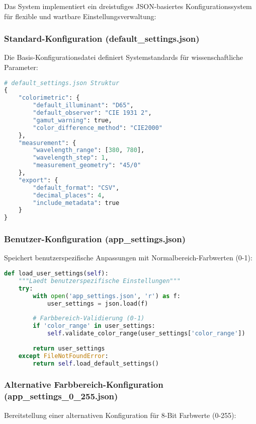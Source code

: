 Das System implementiert ein dreistufiges JSON-basiertes Konfigurationssystem für flexible und wartbare Einstellungsverwaltung:

\subsubsection{Standard-Konfiguration (default\_settings.json)}
Die Basis-Konfigurationsdatei definiert Systemstandards für wissenschaftliche Parameter:

\begin{lstlisting}[language=Python, caption=Standard-Konfiguration Struktur]
# default_settings.json Struktur
{
    "colorimetric": {
        "default_illuminant": "D65",
        "default_observer": "CIE 1931 2",
        "gamut_warning": true,
        "color_difference_method": "CIE2000"
    },
    "measurement": {
        "wavelength_range": [380, 780],
        "wavelength_step": 1,
        "measurement_geometry": "45/0"
    },
    "export": {
        "default_format": "CSV",
        "decimal_places": 4,
        "include_metadata": true
    }
}
\end{lstlisting}

\subsubsection{Benutzer-Konfiguration (app\_settings.json)}
Speichert benutzerspezifische Anpassungen mit Normalbereich-Farbwerten (0-1):

\begin{lstlisting}[language=Python, caption=Benutzer-Konfiguration Management]
def load_user_settings(self):
    """Laedt benutzerspezifische Einstellungen"""
    try:
        with open('app_settings.json', 'r') as f:
            user_settings = json.load(f)
            
        # Farbbereich-Validierung (0-1)
        if 'color_range' in user_settings:
            self.validate_color_range(user_settings['color_range'])
            
        return user_settings
    except FileNotFoundError:
        return self.load_default_settings()
\end{lstlisting}

\subsubsection{Alternative Farbbereich-Konfiguration (app\_settings\_0\_255.json)}
Bereitstellung einer alternativen Konfiguration für 8-Bit Farbwerte (0-255):

